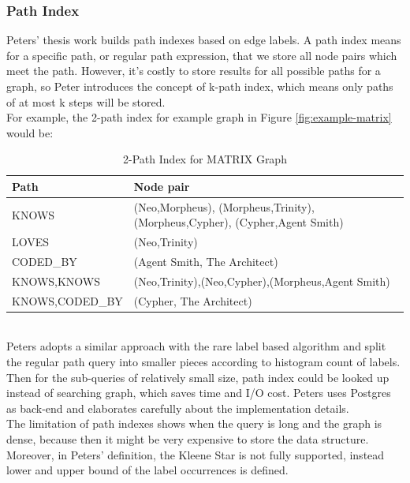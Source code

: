 \subsubsection{Path Index}
Peters' thesis work \cite{peters2015thesis} builds path indexes based on edge labels. A path index means for a specific path, or regular path expression, that we store all node pairs which meet the path. However, it's costly to store results for all possible paths for a graph, so Peter introduces the concept of k-path index, which means only paths of at most k steps will be stored.\\
For example, the 2-path index for example graph in Figure \ref{fig:example-matrix} would be:
\begin{table}[h!]
\def\arraystretch{1.5}
\centering
\caption{2-Path Index for MATRIX Graph}
\label{2-path-index}
\begin{tabular}{|l|m{20em}|}
\hline
Path            & Node pair                                                                \\
\hline
KNOWS           & (Neo,Morpheus), (Morpheus,Trinity), (Morpheus,Cypher), (Cypher,Agent Smith) \\
\hline
LOVES           & (Neo,Trinity)                                                            \\
\hline
CODED\_BY       & (Agent Smith, The Architect)                                             \\
\hline
KNOWS,KNOWS     & (Neo,Trinity),(Neo,Cypher),(Morpheus,Agent Smith)                             \\
\hline
KNOWS,CODED\_BY & (Cypher, The Architect)\\     
\hline
\end{tabular}
\end{table}
\\Peters adopts a similar approach with the rare label based algorithm and split the regular path query into smaller pieces according to histogram count of labels. Then for the sub-queries of relatively small size, path index could be looked up instead of searching graph, which saves time and I/O cost. Peters uses Postgres as back-end and elaborates carefully about the implementation details.\\
The limitation of path indexes shows when the query is long and the graph is dense, because then it might be very expensive to store the data structure. Moreover, in Peters' definition, the Kleene Star is not fully supported, instead lower and upper bound of the label occurrences is defined. 
